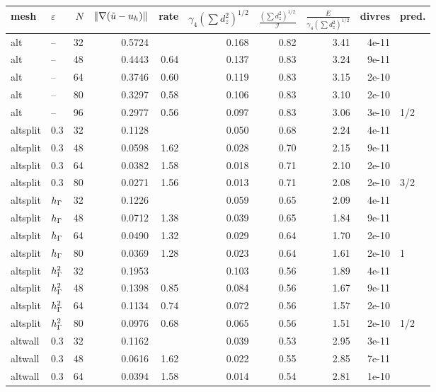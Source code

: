 \begin{table}[ht]\centering\small
\begin{tabular}{llrrrrrrrl}\toprule
mesh & $\varepsilon$ & $N$ & $\|\nabla(\tilde u-u_h)\|$ & rate & $\gamma_4(\sum d_z^2)^{1/2}$ & $\frac{(\sum d_z^2)^{1/2}}{\mathcal I}$ & $\frac{E}{\gamma_4(\sum d_z^2)^{1/2}}$ & divres & pred.\\\midrule
alt & -- & 32 & 0.5724 &  & 0.168 & 0.82 & 3.41 & 4e-11 & \\
alt & -- & 48 & 0.4443 & 0.64 & 0.137 & 0.83 & 3.24 & 9e-11 & \\
alt & -- & 64 & 0.3746 & 0.60 & 0.119 & 0.83 & 3.15 & 2e-10 & \\
alt & -- & 80 & 0.3297 & 0.58 & 0.106 & 0.83 & 3.10 & 2e-10 & \\
alt & -- & 96 & 0.2977 & 0.56 & 0.097 & 0.83 & 3.06 & 3e-10 & 1/2\\
\midrule
altsplit & $0.3$ & 32 & 0.1128 &  & 0.050 & 0.68 & 2.24 & 4e-11 & \\
altsplit & $0.3$ & 48 & 0.0598 & 1.62 & 0.028 & 0.70 & 2.15 & 9e-11 & \\
altsplit & $0.3$ & 64 & 0.0382 & 1.58 & 0.018 & 0.71 & 2.10 & 2e-10 & \\
altsplit & $0.3$ & 80 & 0.0271 & 1.56 & 0.013 & 0.71 & 2.08 & 2e-10 & 3/2\\
\midrule
altsplit & $h_\Gamma$ & 32 & 0.1226 &  & 0.059 & 0.65 & 2.09 & 4e-11 & \\
altsplit & $h_\Gamma$ & 48 & 0.0712 & 1.38 & 0.039 & 0.65 & 1.84 & 9e-11 & \\
altsplit & $h_\Gamma$ & 64 & 0.0490 & 1.32 & 0.029 & 0.64 & 1.70 & 2e-10 & \\
altsplit & $h_\Gamma$ & 80 & 0.0369 & 1.28 & 0.023 & 0.64 & 1.61 & 2e-10 & 1\\
\midrule
altsplit & $h_\Gamma^2$ & 32 & 0.1953 &  & 0.103 & 0.56 & 1.89 & 4e-11 & \\
altsplit & $h_\Gamma^2$ & 48 & 0.1398 & 0.85 & 0.084 & 0.56 & 1.67 & 9e-11 & \\
altsplit & $h_\Gamma^2$ & 64 & 0.1134 & 0.74 & 0.072 & 0.56 & 1.57 & 2e-10 & \\
altsplit & $h_\Gamma^2$ & 80 & 0.0976 & 0.68 & 0.065 & 0.56 & 1.51 & 2e-10 & 1/2\\
\midrule
altwall & $0.3$ & 32 & 0.1162 &  & 0.039 & 0.53 & 2.95 & 3e-11 & \\
altwall & $0.3$ & 48 & 0.0616 & 1.62 & 0.022 & 0.55 & 2.85 & 7e-11 & \\
altwall & $0.3$ & 64 & 0.0394 & 1.58 & 0.014 & 0.54 & 2.81 & 1e-10 & \\

\end{tabular}
\end{table}
